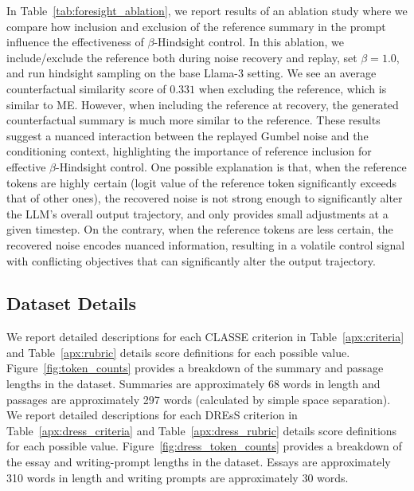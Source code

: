 \documentclass[11pt]{article}
\begin{document}
In Table~\ref{tab:foresight_ablation}, we report results of an ablation study where we compare how inclusion and exclusion of the reference summary in the prompt influence the effectiveness of $\beta$-Hindsight control. In this ablation, we include/exclude the reference both during noise recovery and replay, set $\beta=1.0$, and run hindsight sampling on the base Llama-3 setting. We see an average counterfactual similarity score of $0.331$ when excluding the reference, which is similar to ME. However, when including the reference at recovery, the generated counterfactual summary is much more similar to the reference. These results suggest a nuanced interaction between the replayed Gumbel noise and the conditioning context, highlighting the importance of reference inclusion for effective $\beta$-Hindsight control. One possible explanation is that, when the reference tokens are highly certain (logit value of the reference token significantly exceeds that of other ones), the recovered noise is not strong enough to significantly alter the LLM's overall output trajectory, and only provides small adjustments at a given timestep. On the contrary, when the reference tokens are less certain, the recovered noise encodes nuanced information, resulting in a volatile control signal with conflicting objectives that can significantly alter the output trajectory. 

\subsection{Dataset Details} \label{apx:classe}

We report detailed descriptions for each CLASSE criterion in Table~\ref{apx:criteria} and Table~\ref{apx:rubric} details score definitions for each possible value. Figure~\ref{fig:token_counts} provides a breakdown of the summary and passage lengths in the dataset. Summaries are approximately 68 words in length and passages are approximately 297 words (calculated by simple space separation). We report detailed descriptions for each DREsS criterion in Table~\ref{apx:dress_criteria} and Table~\ref{apx:dress_rubric} details score definitions for each possible value. Figure~\ref{fig:dress_token_counts} provides a breakdown of the essay and writing-prompt lengths in the dataset. Essays are approximately 310 words in length and writing prompts are approximately 30 words.
\end{document}
